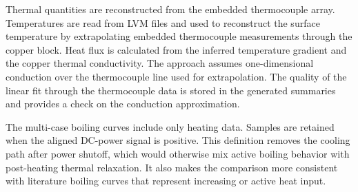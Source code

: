 \documentclass[final,1p,times]{elsarticle}
\begin{document}
\begin{table}[t]
  \centering
  \caption{Operational criteria used to classify developed oscillatory MEB-like behavior.}
\end{table}

Thermal quantities are reconstructed from the embedded thermocouple array. Temperatures are read from LVM files and used to reconstruct the surface temperature by extrapolating embedded thermocouple measurements through the copper block. Heat flux is calculated from the inferred temperature gradient and the copper thermal conductivity. The approach assumes one-dimensional conduction over the thermocouple line used for extrapolation. The quality of the linear fit through the thermocouple data is stored in the generated summaries and provides a check on the conduction approximation.

The multi-case boiling curves include only heating data. Samples are retained when the aligned DC-power signal is positive. This definition removes the cooling path after power shutoff, which would otherwise mix active boiling behavior with post-heating thermal relaxation. It also makes the comparison more consistent with literature boiling curves that represent increasing or active heat input.
\end{document}
